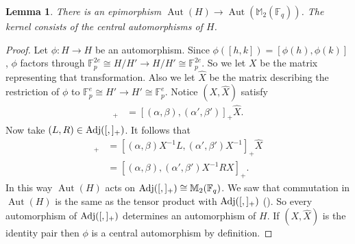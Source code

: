 \documentclass{toc}
\numberwithin{equation}{section}
\theoremstyle{plain}       %
\newtheorem{lem}[equation]{Lemma}
\theoremstyle{remark}
\theoremstyle{definition}
\numberwithin{figure}{section}
\numberwithin{table}{section}
\newcommand{\bbF}{\mathbb{F}}  %
\DeclareMathOperator{\Aut}{Aut}  %
\begin{document}
\begin{lem}\label{lem:aut-H}
There is an epimorphism $\Aut(H)\to \Aut(\mathbb{M}_2(\bbF_q))$.  The kernel
consists of the central automorphisms of $H$.
\end{lem}
\begin{proof}
Let $\phi:H\to H$ be an automorphism.  Since $\phi([h,k])=[\phi(h),\phi(k)]$,
$\phi$ factors through $\bbF_p^{2e}\cong H/H'\to H/H'\cong\bbF_p^{2e}$. So we
let $X$ be the matrix representing that transformation.  Also we let $\hat{X}$
be the matrix describing the restriction of $\phi$ to $\bbF_p^e\cong H'\to
H'\cong\bbF_p^e$.  Notice $(X,\hat{X})$ satisfy
\begin{align*}
	[(\alpha,\beta)X,(\alpha',\beta')X]_+ 
		& = [(\alpha,\beta),(\alpha',\beta')]_+\hat{X}.
\end{align*}
Now take $(L,R)\in {\rm Adj}([,]_+)$.  It follows that
\begin{align*}
	[(\alpha,\beta)X^{-1}LX,(\alpha',\beta')]_+
		&= [(\alpha,\beta)X^{-1}L,(\alpha',\beta')X^{-1}]_+\hat{X}\\
%
		& =[(\alpha,\beta),(\alpha',\beta')X^{-1}RX]_+.
\end{align*}
In this way $\Aut(H)$ acts on ${\rm Adj}([,]_+)\cong \mathbb{M}_{2}(\bbF_q)$.
We saw that commutation in $\Aut(H)$ is the same as the tensor product with
${\rm Adj}([,]_+)$ ().  So every automorphism of ${\rm
Adj}([,]_+)$ determines an automorphism of $H$.  If $(X,\hat{X})$ is the
identity pair then $\phi$ is a central automorphism by definition.
\end{proof}
\end{document}
